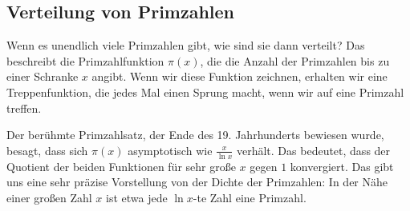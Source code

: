 \subsection{Verteilung von Primzahlen}

\begin{spoken-clean}[01:06:00 - 01:11:00]
Wenn es unendlich viele Primzahlen gibt, wie sind sie dann verteilt? Das beschreibt die Primzahlfunktion $\pi(x)$, die die Anzahl der Primzahlen bis zu einer Schranke $x$ angibt. Wenn wir diese Funktion zeichnen, erhalten wir eine Treppenfunktion, die jedes Mal einen Sprung macht, wenn wir auf eine Primzahl treffen.

Der berühmte Primzahlsatz, der Ende des 19. Jahrhunderts bewiesen wurde, besagt, dass sich $\pi(x)$ asymptotisch wie $\frac{x}{\ln x}$ verhält. Das bedeutet, dass der Quotient der beiden Funktionen für sehr große $x$ gegen $1$ konvergiert. Das gibt uns eine sehr präzise Vorstellung von der Dichte der Primzahlen: In der Nähe einer großen Zahl $x$ ist etwa jede $\ln x$-te Zahl eine Primzahl.
\end{spoken-clean}

\begin{math-stroke}

\begin{center}
\end{center}
\end{math-stroke}

